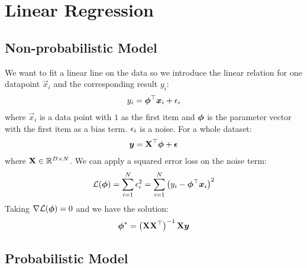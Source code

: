 
\chapter{Linear Regression}
\label{chapter6}

\section{Non-probabilistic Model}
\label{section6.1}

We want to fit a linear line on the data so we introduce the linear relation for one datapoint $\vec{x}_i$ and the corresponding result $y_i$:
\begin{align*}
	y_i=\boldsymbol{\phi}{}^\top\boldsymbol{x}_i+\epsilon_i
\end{align*}
where $\vec{x}_i$ is a data point with $1$ as the first item and $\boldsymbol{\phi}$ is the parameter vector with the first item as a bias term. $\epsilon_i$ is a noise. For a whole dataset:
\begin{align*}
	\boldsymbol{y}=\mathbf{X}{}^\top\boldsymbol{\phi}+\boldsymbol{\epsilon}
\end{align*}
where $\mathbf{X}\in\mathbb{R}^{D\times N}$. We can apply a squared error loss on the noise term:
\begin{align*}
	\mathcal{L}(\boldsymbol{\phi})=\sum_{i=1}^N\epsilon_i^2=\sum_{i=1}^N\left(y_i-\boldsymbol{\phi}{}^\top\boldsymbol{x}_i\right)^2
\end{align*}
Taking $\nabla\mathcal{L}(\boldsymbol{\phi})=0$ and we have the solution:
\begin{align*}
	\boldsymbol{\phi}^*=\left(\mathbf{X}\mathbf{X}{}^\top\right)^{-1}\mathbf{X}\boldsymbol{y}
\end{align*}



\section{Probabilistic Model}
\label{section6.2}

